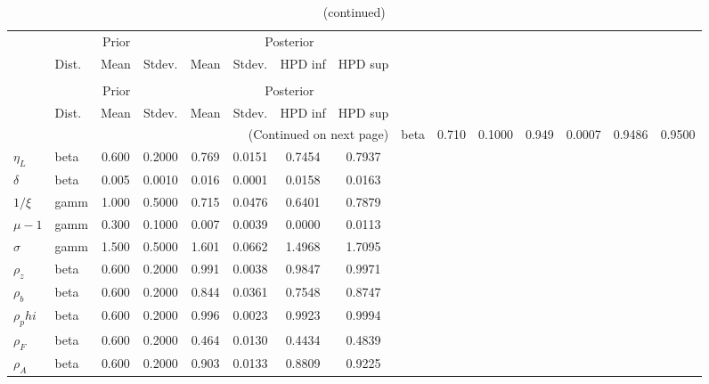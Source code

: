  
\begin{center}
\begin{longtable}{llcccccc} 
\caption{Results from Metropolis-Hastings (parameters)}
 \label{Table:MHPosterior:1}\\
\toprule 
  & \multicolumn{3}{c}{Prior}  &  \multicolumn{4}{c}{Posterior} \\
  \cmidrule(r{.75em}){2-4} \cmidrule(r{.75em}){5-8}
  & Dist. & Mean  & Stdev. & Mean & Stdev. & HPD inf & HPD sup\\
\midrule \endfirsthead 
\caption{(continued)}\\\toprule 
  & \multicolumn{3}{c}{Prior}  &  \multicolumn{4}{c}{Posterior} \\
  \cmidrule(r{.75em}){2-4} \cmidrule(r{.75em}){5-8}
  & Dist. & Mean  & Stdev. & Mean & Stdev. & HPD inf & HPD sup\\
\midrule \endhead 
\bottomrule \multicolumn{8}{r}{(Continued on next page)} \endfoot 
\bottomrule \endlastfoot 
$b$ & beta &   0.710 & 0.1000 &   0.949& 0.0007 &  0.9486 &  0.9500 \\ 
$\eta_L$ & beta &   0.600 & 0.2000 &   0.769& 0.0151 &  0.7454 &  0.7937 \\ 
${\delta}$ & beta &   0.005 & 0.0010 &   0.016& 0.0001 &  0.0158 &  0.0163 \\ 
${1/\xi}$ & gamm &   1.000 & 0.5000 &   0.715& 0.0476 &  0.6401 &  0.7879 \\ 
${\mu-1}$ & gamm &   0.300 & 0.1000 &   0.007& 0.0039 &  0.0000 &  0.0113 \\ 
${\sigma}$ & gamm &   1.500 & 0.5000 &   1.601& 0.0662 &  1.4968 &  1.7095 \\ 
${\rho_z}$ & beta &   0.600 & 0.2000 &   0.991& 0.0038 &  0.9847 &  0.9971 \\ 
${\rho_b}$ & beta &   0.600 & 0.2000 &   0.844& 0.0361 &  0.7548 &  0.8747 \\ 
${\rho_phi}$ & beta &   0.600 & 0.2000 &   0.996& 0.0023 &  0.9923 &  0.9994 \\ 
${\rho_F}$ & beta &   0.600 & 0.2000 &   0.464& 0.0130 &  0.4434 &  0.4839 \\ 
${\rho_A}$ & beta &   0.600 & 0.2000 &   0.903& 0.0133 &  0.8809 &  0.9225 \\ 
\end{longtable}
 \end{center}
